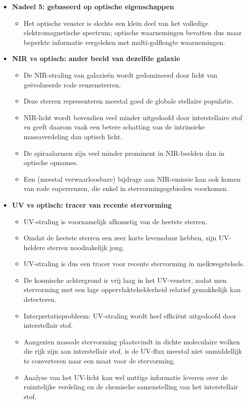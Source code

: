 \documentclass[10pt,a4paper]{article}
\begin{document}
\begin{itemize}
  \item \textbf{Nadeel 5: gebaseerd op optische eigenschappen}
  \begin{itemize}
    \item Het optische venster is slechts een klein deel van het volledige elektromagnetische spectrum; optische waarnemingen bevatten dus maar beperkte informatie vergeleken met multi-golflengte waarnemingen.
  \end{itemize}

  \item \textbf{NIR vs optisch: ander beeld van dezelfde galaxie}
  \begin{itemize}
    \item De NIR-straling van galaxieën  wordt gedomineerd door licht van geëvolueerde rode reuzensterren.
    \item Deze sterren representeren meestal goed de globale stellaire populatie.
    \item NIR-licht wordt bovendien veel minder uitgedoofd door interstellaire stof en geeft daarom vaak een betere schatting van de intrinsieke massaverdeling dan optisch licht.
    \item De spiraalarmen zijn veel minder prominent in NIR-beelden dan in optische opnames.
    \item Een (meestal verwaarloosbare) bijdrage aan NIR-emissie kan ook komen van rode superreuzen, die enkel in stervormingsgebieden voorkomen.
  \end{itemize}

  \item \textbf{UV vs optisch: tracer van recente stervorming}
  \begin{itemize}
    \item UV-straling is voornamelijk afkomstig van de heetste sterren.
    \item Omdat de heetste sterren een zeer korte levensduur hebben, zijn UV-heldere sterren noodzakelijk jong.
    \item UV-straling is dus een tracer voor recente stervorming in melkwegstelsels.
    \item De kosmische achtergrond is vrij laag in het UV-venster, zodat men stervorming met een lage oppervlaktehelderheid relatief gemakkelijk kan detecteren.
    \item Interpretatieprobleem: UV-straling wordt heel efficiënt uitgedoofd door interstellair stof.
    \item Aangezien massale stervorming plaatsvindt in dichte moleculaire wolken die rijk zijn aan interstellair stof, is de UV-flux meestal niet onmiddellijk te converteren naar een maat voor de stervorming.
    \item Analyse van het UV-licht kan wel nuttige informatie leveren over de ruimtelijke verdeling en de chemische samenstelling van het interstellair stof.
  \end{itemize}


\end{itemize}
\end{document}
